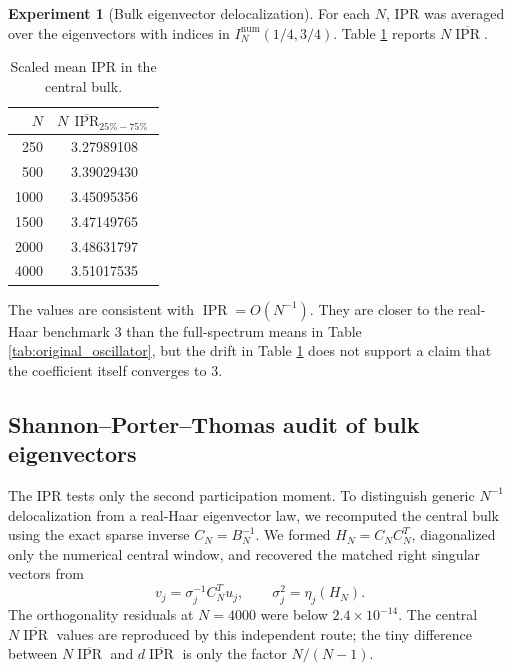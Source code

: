 \documentclass[11pt]{amsart}
\numberwithin{equation}{section}
\theoremstyle{plain}
\theoremstyle{definition}
\newtheorem{experiment}[theorem]{Experiment}
\theoremstyle{remark}
\newcommand{\IPR}{\operatorname{IPR}}
\begin{document}
\begin{experiment}[Bulk eigenvector delocalization]
\label{exp:bulk_ipr}
For each $N$, IPR was averaged over the eigenvectors with indices in $I_N^{\mathrm{num}}(1/4,3/4)$.  Table \ref{tab:bulk_ipr} reports $N\overline{\IPR}$.

\begin{table}[htbp]
\centering
\caption{Scaled mean IPR in the central bulk.}
\label{tab:bulk_ipr}
\begin{tabular}{rc}
\toprule
$N$ & $N\,\overline{\IPR}_{25\%-75\%}$\\
\midrule
250  & 3.27989108\\
500  & 3.39029430\\
1000 & 3.45095356\\
1500 & 3.47149765\\
2000 & 3.48631797\\
4000 & 3.51017535\\
\bottomrule
\end{tabular}
\end{table}

The values are consistent with $\IPR=O(N^{-1})$.  They are closer to the real-Haar benchmark $3$ than the full-spectrum means in Table \ref{tab:original_oscillator}, but the drift in Table \ref{tab:bulk_ipr} does not support a claim that the coefficient itself converges to $3$.
\end{experiment}

\subsection{Shannon--Porter--Thomas audit of bulk eigenvectors}
\label{subsec:shannon_numerics}

The IPR tests only the second participation moment.  To distinguish generic $N^{-1}$ delocalization from a real-Haar eigenvector law, we recomputed the central bulk using the exact sparse inverse $C_N=B_N^{-1}$.  We formed $H_N=C_NC_N^T$, diagonalized only the numerical central window, and recovered the matched right singular vectors from
\begin{equation}
v_j=\sigma_j^{-1}C_N^Tu_j,
\qquad
\sigma_j^2=\eta_j(H_N).
\label{eq:numerical_right_vector_recovery}
\end{equation}
The orthogonality residuals at $N=4000$ were below $2.4\times10^{-14}$.  The central $N\overline{\IPR}$ values are reproduced by this independent route; the tiny difference between $N\overline{\IPR}$ and $d\overline{\IPR}$ is only the factor $N/(N-1)$.
\end{document}
